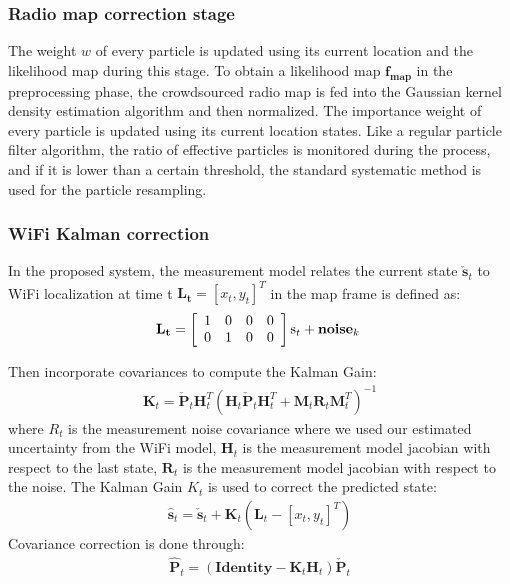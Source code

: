 \subsubsection{Radio map correction stage} The weight $w$ of every particle is updated using its current location and the
likelihood map during this stage. To obtain a likelihood map $\mathbf{f_{map}}$ in the preprocessing phase, the crowdsourced radio map is fed into the Gaussian kernel density estimation algorithm \cite{} and then normalized.  The importance weight of every particle is updated using its current location states.
Like a regular particle filter algorithm, the ratio of effective particles is monitored during the process, and if it is lower than a certain threshold, the standard systematic method \cite{} is used for the particle resampling.

\subsubsection{WiFi Kalman correction}

 In the proposed system, the measurement model relates the current state $\mathbf{\check{s}}_t$ to WiFi localization at time t $\mathbf{L_{t}}$$ = [x_t, y_t]^T$ in the map frame is defined as:
\begin{equation}
\begin{aligned}
 \mathbf{L_{t}}=\left[\begin{array}{c c c c}{{1}}&{{0}}&{{0}}&{{0}}\\ {{0}}&{{1}}&{{0}}&{{0}}\end{array}\right]\mathrm{s}_{t}+{\bf noise}_{k}\;
\end{aligned}
\end{equation}

Then incorporate covariances to compute the Kalman Gain:
\begin{equation}
\begin{aligned}
\mathbf{K}_t = \mathbf{\check{P}}_t \mathbf{H}_t^T \left(\mathbf{H}_t \mathbf{\check{P}}_t \mathbf{H}_t^T + \mathbf{M}_t \mathbf{R}_t \mathbf{M}_t^T \right)^{-1} 
\end{aligned}
\end{equation}
where $R_t$ is the measurement noise covariance where we used our estimated uncertainty from the WiFi model, $\mathbf{H}_t$ is the measurement model jacobian with respect to the last state, $\mathbf{R}_t$ is the measurement model jacobian with respect to the noise. The Kalman Gain $K_t$ is used to correct the predicted state:
\begin{equation}
\begin{aligned}
\mathbf{\hat{s}}_t = \mathbf{\check{s}}_t + \mathbf{K}_t \left(\mathbf{L}_t - [x_t,y_t]^T\right)
\end{aligned}
\end{equation}
Covariance correction is done through:
\begin{equation}
\begin{aligned}
\mathbf{\hat{P}}_t = \left(\mathbf{Identity} - \mathbf{K}_t \mathbf{H}_t \right)\mathbf{\check{P}}_t
\end{aligned}
\end{equation}

